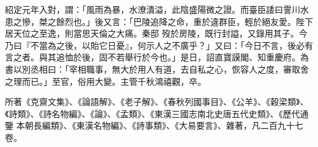 \begin{pinyinscope}
 紹定元年入對，謂：「風雨為暴，水潦潰溢，此陰盛陽微之證。而臺臣諉曰霅川水患之慘，桀之餘烈也。」後又言：「巴陵追降之命，重於違群臣，輕於絕友愛。陛下居天位之至逸，則當思天倫之大痛。秦邸
 歿於房陵，既行封謚，又錄用其子。今乃曰『不當為之後，以貽它日憂』，何示人之不廣乎？」又曰：「今日不言，後必有言之者。與其追恤於後，固不若舉行於今也。」是日，詔直寶謨閣、知重慶府。為書以別丞相曰：「宰相職事，無大於用人有道，去自私之心，恢容人之度，審取舍之理而已。」至官，俗用大變。主管千秋鴻禧觀，卒。



 所著《克齋文集》、《論語解》、《老子解》、《春秋列國事目》、《公羊》、《穀梁類》、《詩類》、《詩名物編》、《論》、《孟類》、《東漢三國志南北史唐五代史類》、《歷代通鑒
 本朝長編類》、《東漢名物編》、《詩事類》、《大易要言》、雜著，凡二百九十七卷。



\end{pinyinscope}